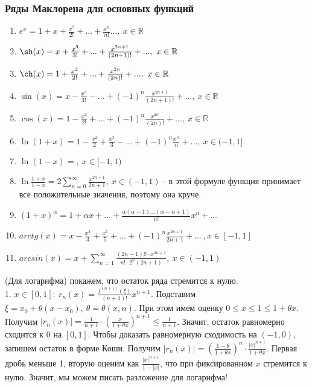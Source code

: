 \subsubsection{Ряды Маклорена для основных функций}
\begin{enumerate}
    \item $e^x=1+x+\frac{x^2}{2!}+...+\frac{x^n}{n!}...,~x\in\mathbb{R}$
\item $\sh(x)=x+\frac{x^3}{3!}+...+\frac{x^{2n+1}}{(2n+1)!}+...,~
x\in\mathbb{R}$
\item $\ch(x)=1+\frac{x^2}{2!}+...+\frac{x^{2n}}{(2n)!}+...,~x\in\mathbb{R}$
\item $\sin(x)=x-\frac{x^3}{3!}-...+(-1)^n\frac{x^{2n+1}}{(2n+1)!}+...,
    ~x\in \mathbb{R}$
\item $\cos(x)=1-\frac{x^2}{2!}+...+(-1)^n \frac{x^{2n}}{(2n)!}+...,~
    x\in\mathbb{R}$ 
\item $\ln(1+x)=1-\frac{x^2}{2}+\frac{x^3}{3}-...+(-1)^n
    \frac{x^n}{n}+...,~x\in(-1,1]$
\item $\ln(1-x)=,~x\in[-1,1)$
\item $\ln \frac{1+x}{1-x}=2 \sum\limits_{n=0}^{\infty} \frac{x^{2n+1}}
    {2n+1},~ x\in(-1,1)$ - в этой формуле функция принимает все положительные
значения, поэтому она круче. 
\item $(1+x)^\alpha=1+\alpha x+...+\frac{\alpha(\alpha-1)...(\alpha-n+1)}
    {n!}x^n+...$
\item $arctg(x)=x-\frac{x^3}{3}+\frac{x^5}{5}+...+(-1)^n \frac{x^{2n+1}}
    {2n+1}+...~,x\in[-1,1]$
\item $arcsin(x)=x+\sum\limits_{n=1}^{\infty} \frac{(2n-1)!!\cdot x^{2n+1}}
    {n!\cdot 2^n(2n+1)},~x\in(-1,1)$


\end{enumerate}
(Для логарифма) покажем, что остаток ряда стремится к нулю.\\
1. $x\in[0,1]:~r_n(x)=\frac{f^{(n+1)}(\xi)}{(n+1)!}x^{n+1}$. 
Подставим $\xi=x_0+\theta(x-x_0),~\theta=\theta(x,n)$.
При этом имем оценку $0\leqslant x\leqslant 1\leqslant 1+\theta x$.
Получим
$|r_n(x)|=\frac{1}{n+1}\cdot \left( \frac{x}{1+\theta x} \right)^{n+1}
\leqslant \frac{1}{n+1}$. Значит, остаток равномерно сходится к 0 на $[0,1]$.
Чтобы доказать равномерную сходимость на  $(-1,0)$, запишем остаток в 
форме Коши. Получим  $|r_n(x)|=\left( \frac{1-\theta}{1+\theta x} \right)^n
\cdot \frac{|x|^{n+1}}{1+\theta x}$. Первая дробь меньше 1, вторую 
оценим как $\frac{|x|^{n+1}}{1-{|x|}}$, что при фиксированном $x$ стремится 
к нулю.
Значит, мы можем писать разложение для логарифма!\\
